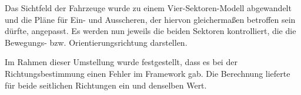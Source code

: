 Das Sichtfeld der Fahrzeuge wurde zu einem Vier-Sektoren-Modell abgewandelt und die Pläne für Ein- und Ausscheren, der hiervon gleichermaßen betroffen sein dürfte, angepasst.
Es werden nun jeweils die beiden Sektoren kontrolliert, die die Bewegungs- bzw. Orientierungsrichtung darstellen.

Im Rahmen dieser Umstellung wurde festgestellt, dass es bei der Richtungsbestimmung einen Fehler im Framework gab.
Die Berechnung lieferte für beide seitlichen Richtungen ein und denselben Wert.

